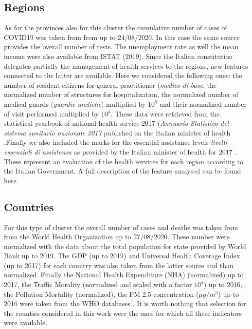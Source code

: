 \documentclass[
12pt, %
a4paper, %
oneside, %
headinclude,footinclude, %
BCOR5mm, %
]{scrartcl}
\begin{document}
\subsection{Regions}
As for the provinces also for this cluster the cumulative number of cases of COVID19 was taken from from \cite{github-protezionecivile} up to 24/08/2020. In this case the same source provides the overall number of tests. The unemployment rate as well the mean income were also available from ISTAT \cite{ISTAT} (2019). Since the Italian constitution delegates partially the management of health services to the regions, new features connected to the latter are available. Here we considered the following ones: the number of resident citizens for general practitioner (\textit{medico di base}, the normalized number of structures for hospitalization, the normalized number of medical guards (\textit{guardie mediche}) multiplied by $10^{5}$ and their normalized number of visit performed multiplied by $10^{5}$. These data were retrieved from the statistical yearbook of national health service 2017 (\textit{Annuario Statistico del sistema sanitario nazionale 2017} published on the Italian minister of health \cite{AnnuarioSSN2017}.Finally we also included the marks for the essential assistance levels \textit{livelli essenziali di assistenza} as provided by the Italian minister of health for 2017 \cite{LeaRank} . These represent an evaluation of the health services for each region according to the Italian Government. A full description of the feature analysed can be found here \cite{LeaDesc}

\subsection{Countries}

For this type of cluster the overall number of cases and deaths was taken from from the World Health Organization \cite{whoCases} up to 27/08/2020. These number were normalized with the data about the total population for state provided by World Bank \cite{worldBank} up to 2019. The GDP (up to 2019) and Universal Health Coverage Index \cite{whoUHC} (up to 2017) for each country was also taken from the latter source \cite{worldBank} and than normalized. Finally the National Health Expenditure (NHA) (normalized) up to 2017, the Traffic Morality (normalized and scaled with a factor $10^{5}$) up to 2016, the Pollution Mortality (normalized), the PM 2.5 concentration ($\mu g/m^{3}$) up to 2016 were taken from the WHO databases \cite{whoDb}. It is worth nothing that selection for the counties considered in this work were the ones for which all these indicators were available. 
\end{document}
